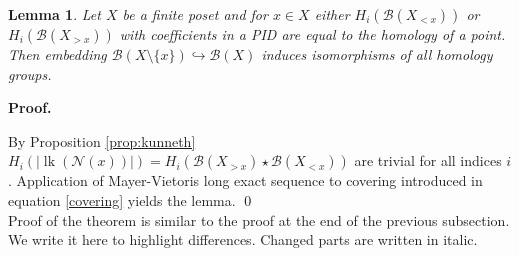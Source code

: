\documentclass[english,12pt]{article}
\newcounter{stmcounter}[section]
\numberwithin{equation}{section}
\newtheorem{lemma}[stmcounter]{Lemma}
\theoremstyle{definition}
\theoremstyle{remark}
\newenvironment{pf}{\noindent\textbf{Proof.}}{\qed}
\begin{document}
\begin{lemma}
  \label{lem:trivialties}
  Let $X$ be a finite poset and for $x \in X$ either $H_i(\mathcal{B}(X_{< x}))$ or $H_i(\mathcal{B}(X_{> x}))$ with coefficients in a PID are equal to the homology of a point. Then embedding $\mathcal{B}(X \setminus \{x\}) \hookrightarrow \mathcal{B}(X)$ induces isomorphisms of all homology groups.
\end{lemma}

\begin{pf} ~ \par
  By Proposition \ref{prop:kunneth} $H_i(\left|\operatorname{lk}(\mathcal{N}(x))\right|) = H_i(\mathcal{B}(X_{>x}) \star \mathcal{B}(X_{<x}))$ are trivial for all indices $i$.
  Application of Mayer-Vietoris long exact sequence to covering introduced in equation \eqref{covering} yields the lemma.
\end{pf}\\

Proof of the theorem is similar to the proof at the end of the previous subsection. We write it here to highlight differences. Changed parts are written in italic.\\
\end{document}
